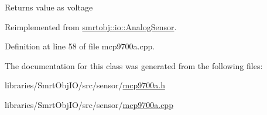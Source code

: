\begin{DoxyReturn}{Returns}
value as voltage 
\end{DoxyReturn}


Reimplemented from \hyperlink{classsmrtobj_1_1io_1_1_analog_sensor_a1084904f7f66c5f1e65b75ebdf3bf6b6}{smrtobj\+::io\+::\+Analog\+Sensor}.



Definition at line 58 of file mcp9700a.\+cpp.



The documentation for this class was generated from the following files\+:\begin{DoxyCompactItemize}
\item 
libraries/\+Smrt\+Obj\+I\+O/src/sensor/\hyperlink{mcp9700a_8h}{mcp9700a.\+h}\item 
libraries/\+Smrt\+Obj\+I\+O/src/sensor/\hyperlink{mcp9700a_8cpp}{mcp9700a.\+cpp}\end{DoxyCompactItemize}
